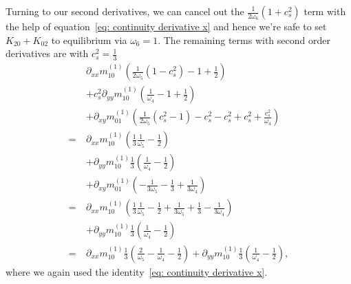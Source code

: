 Turning to our second derivatives, we can cancel out the $\frac{1}{2\omega_6}(1+c_s^2)$ term with the help of equation~\eqref{eq: continuity derivative x} and hence we're safe to set $K_{20} + K_{02}$ to equilibrium via $\omega_6=1$.
The remaining terms with second order derivatives are with $c_s^2=\frac{1}{3}$
\begin{align}
  \label{eq: diffusive start}
  &\partial_{xx} m_{10}^{(1)} \left(
     \frac{1}{2\omega_5} (1 - c_s^2)
     - 1
     + \frac{1}{2}
  \right)
  \\&
  \nonumber
  + c_s^2\partial_{yy} m_{10}^{(1)} \left(
    \frac{1}{\omega_4}
    - 1
    + \frac{1}{2}
  \right)
  \\&
  \nonumber
  + \partial_{xy} m_{01}^{(1)} \left(
    \frac{1}{2\omega_5} (c_s^2 - 1)
    - c_s^2
    - c_s^2
    + c_s^2
    + \frac{c_s^2}{\omega_4}
  \right)
  \\=\ &
  \nonumber
  \partial_{xx} m_{10}^{(1)} \left(
    \frac{1}{3}\frac{1}{\omega_5}
    - \frac{1}{2}
  \right)
  \\&
  \nonumber
  + \partial_{yy} m_{10}^{(1)} \frac{1}{3}\left(
    \frac{1}{\omega_4}
    - \frac{1}{2}
  \right)
  \\&
  \nonumber
  + \partial_{xy} m_{01}^{(1)} \left(
    - \frac{1}{3\omega_5}
    - \frac{1}{3}
    + \frac{1}{3\omega_4}
  \right)
  \\=\ &
  \nonumber
  \partial_{xx} m_{10}^{(1)} \left(
    \frac{1}{3}\frac{1}{\omega_5}
    - \frac{1}{2}
    + \frac{1}{3\omega_5}
    + \frac{1}{3}
    - \frac{1}{3\omega_4}
  \right)
  \\&
  \nonumber
  + \partial_{yy} m_{10}^{(1)} \frac{1}{3}\left(
    \frac{1}{\omega_4}
    - \frac{1}{2}
  \right)
  \\=\ &
  \nonumber
  \partial_{xx} m_{10}^{(1)} \frac{1}{3} \left(
    \frac{2}{\omega_5}
    - \frac{1}{\omega_4}
    - \frac{1}{2}
  \right)
  + \partial_{yy} m_{10}^{(1)} \frac{1}{3}\left(
    \frac{1}{\omega_4}
    - \frac{1}{2}
  \right),
\end{align}
where we again used the identity~\eqref{eq: continuity derivative x}.

